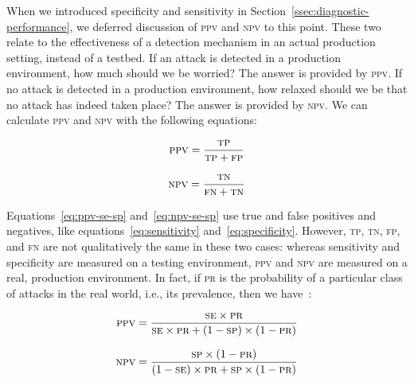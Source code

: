 \documentclass[10pt,journal,compsoc]{IEEEtran}
\begin{document}
When we introduced specificity and sensitivity in
Section~\ref{ssec:diagnostic-performance}, we deferred discussion of
\textsc{ppv} and \textsc{npv} to this point. These two relate to the
effectiveness of a detection mechanism in an actual production setting,
instead of a testbed. If an attack is detected in a production
environment, how much should we be worried? The answer is provided by
\textsc{ppv}. If no attack is detected in a production environment,
how relaxed should we be that no attack has indeed taken place? The
answer is provided by \textsc{npv}. We can calculate \textsc{ppv} and
\textsc{npv} with the following equations:

\vspace{0.5mm}
\noindent\begin{minipage}{0.5\linewidth}
\begin{equation}
\textsc{ppv} = \frac{\textsc{tp}}{\textsc{tp} + \textsc{fp}}
\end{equation}
\end{minipage}
\begin{minipage}{0.5\linewidth}
\begin{equation}
\textsc{npv} = \frac{\textsc{tn}}{\textsc{fn} + \textsc{tn}}
\end{equation}
\end{minipage}\par\vspace{\belowdisplayskip}

\noindent
Equations~\ref{eq:ppv-se-sp} and~\ref{eq:npv-se-sp} use true and false
positives and negatives, like equations~\ref{eq:sensitivity}
and~\ref{eq:specificity}. However, \textsc{tp}, \textsc{tn},
\textsc{fp}, and \textsc{fn} are not qualitatively the same in these two cases:
whereas sensitivity and specificity are measured on a testing
environment, \textsc{ppv} and \textsc{npv} are measured on a real,
production environment. In fact, if \textsc{pr} is the probability of
a particular class of attacks in the real world,
i.e., its prevalence, then we
have~\cite{linn2004}:

\begin{equation}
\textsc{ppv} = \frac{\textsc{se}\times \textsc{pr}}{
\textsc{se}\times \textsc{pr} + (1 - \textsc{sp})\times (1 -
\textsc{pr})}
\label{eq:ppv-se-sp}
\end{equation}

\begin{equation}
\textsc{npv} = \frac{\textsc{sp}\times (1 - \textsc{pr})}{
(1 - \textsc{se})\times \textsc{pr} + \textsc{sp}\times (1 -
\textsc{pr})}
\label{eq:npv-se-sp}
\end{equation}
\end{document}
